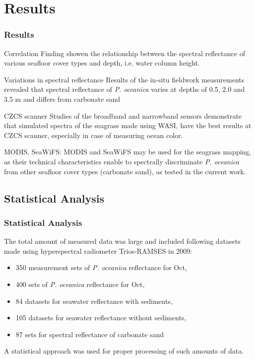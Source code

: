 \documentclass[pdflatex,compress,9pt,
	xcolor={dvipsnames,dvipsnames,svgnames,x11names,table},
	hyperref={colorlinks = true,breaklinks = true, urlcolor = NavyBlue, breaklinks = true}]{beamer}
\begin{document}
\section{Results}
\begin{frame}\frametitle{Results}
\small{
\begin{alertblock}{Correlation}
Finding showen the relationship between the spectral reflectance of various seafloor cover types and depth, i.e. water column height.
\end{alertblock}

\begin{block}{Variations in spectral reflectance}
Results of the in-situ fieldwork measurements revealed that spectral reflectance of \emph{P. oceanica} varies at depths of 0.5, 2.0 and 3.5 m and differs from carbonate sand
\end{block}

\begin{block}{CZCS scanner}
Studies of the broadband and narrowband sensors demonstrate that simulated spectra of the seagrass made using \ac{WASI}, have the best results at \ac{CZCS} scanner, especially in case of measuring ocean color.
\end{block}

\begin{examples}{MODIS, SeaWiFS:}
\ac{MODIS} and \ac{SeaWiFS} may be used for the seagrass mapping, as their technical characteristics enable to spectrally discriminate \emph{P. oceanica} from other seafloor cover types (carbonate sand), as tested in the current work.
\end{examples}
}
\end{frame}

\subsection{Statistical Analysis}
\begin{frame}\frametitle{Statistical Analysis}
The total amount of measured data was large and included following datasets made using hyperspectral radiometer \ac{Trios-RAMSES} in 2009:
\begin{itemize}
	\item 350 measurement sets of \emph{P. oceanica} reflectance for  Oct,
	\item 400 sets of \emph{P. oceanica} reflectance for  Oct,
	\item 84 datasets for seawater reflectance with sediments,
	\item 105 datasets for seawater reflectance without sediments,
	\item 87 sets for spectral reflectance of carbonate sand
\end{itemize}
A statistical approach was used for proper processing of such amounts of data.
\end{frame}
\end{document}
